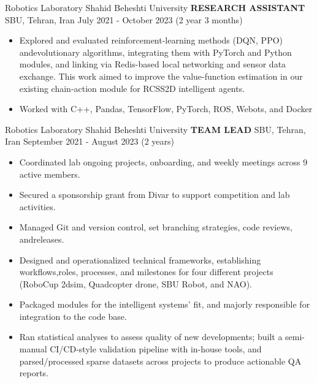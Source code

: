 
\begin{cventries}
    \cventry
    {Robotics Laboratory \textemdash Shahid Beheshti University}
    {\textbf{RESEARCH ASSISTANT}}
    {SBU, Tehran, Iran}
    {July 2021 - October 2023 (2 year 3 months)}
    {
        \begin{itemize}
            \item Explored and evaluated reinforcement-learning methods (DQN, PPO) andevolutionary algorithms, integrating them with PyTorch and Python modules, and linking via Redis-based local networking and sensor data exchange. This work aimed to improve the value-function estimation in our existing chain-action module for RCSS2D intelligent agents.
            \item  Worked with C++, Pandas, TensorFlow, PyTorch, ROS, Webots, and Docker
        \end{itemize}
    }
    \vspace{0.4 cm}
\end{cventries}

\begin{cventries}
    \cventry
    {Robotics Laboratory \textemdash Shahid Beheshti University}
    {\textbf{TEAM LEAD}}
    {SBU, Tehran, Iran}
    {September 2021 - August 2023 (2 years)}
    {
        \begin{itemize}
            \item Coordinated lab ongoing projects, onboarding, and weekly meetings across 9 active members.
            \item Secured a sponsorship grant from Divar to support competition and lab activities.
            \item Managed Git and version control, set branching strategies, code reviews, andreleases.
            \item Designed and operationalized technical frameworks, establishing workflows,roles, processes, and milestones for four different projects (RoboCup 2dsim, Quadcopter drone, SBU Robot, and NAO).
            \item Packaged modules for the intelligent systems' fit, and majorly responsible for integration to the code base.
            \item Ran statistical analyses to assess quality of new developments; built a semi-manual CI/CD-style validation pipeline with in-house tools, and parsed/processed sparse datasets across projects to produce actionable QA reports.
        \end{itemize}
    }
\end{cventries}

